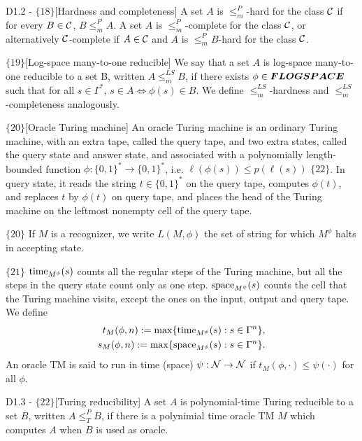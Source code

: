 \documentclass{article}
\begin{document}
\begin{flexidefinition}{D1.2 - $\{18\}$}[Hardness and completeness]
    A set $A$ is $\leq_m^P$-hard for the class $\mathcal{C}$ if for every $B \in \mathcal{C}$, $B \leq_m^P A$. A set $A$ is $\leq_m^P$-complete for the class $\mathcal{C}$, or alternatively $\mathcal{C}$-complete if $A \in \mathcal{C}$ and $A$ is $\leq_m^P B$-hard for the class $\mathcal{C}$. 
\end{flexidefinition} 

\begin{flexidefinition}{$\{19\}$}[Log-space many-to-one reducible]
    We say that a set $A$ is log-space many-to-one reducible to a set B, written $A \leq^{LS}_m B$, if there exists $\phi \in \boldsymbol{FLOGSPACE}$ such that for all $s \in \Gamma^\ast$, $s \in A \iff \phi(s) \in B$. We define $\leq_m^{LS}$-hardness and $\leq_m^{LS}$-completeness analogously.
\end{flexidefinition}


\begin{flexidefinition}{$\{20\}$}[Oracle Turing machine]
    An oracle Turing machine is an ordinary Turing machine, with an extra tape, called the query tape, and two extra states, called the query state and answer state, and associated with a polynomially length-bounded function $\phi : \{0,1\}^\ast \to \{0,1\}^\ast$, i.e. $\ell(\phi(s)) \leq p(\ell(s))$ $\{22\}$. In query state, it reads the string $t \in \{0,1\}^\ast$ on the query tape, computes $\phi(t)$, and replaces $t$ by $\phi(t)$ on query tape, and places the head of the Turing machine on the leftmost nonempty cell of the query tape.
\end{flexidefinition}

$\{20\}$ If $M$ is a recognizer, we write $L(M,\phi)$ the set of string for which $M^\phi$ halts in accepting state.

$\{21\}$ $\operatorname{time}_{M^\phi}(s)$ counts all the regular steps of the Turing machine, but all the steps in the query state count only as one step. $\operatorname{space}_{M^\phi}(s)$ counts the cell that the Turing machine visits, except the ones on the input, output and query tape. We define
\begin{align}
    t_M(\phi, n) := \max \{\operatorname{time}_{M^\phi}(s) : s \in \Gamma^n \},\\
    s_M(\phi, n) := \max \{\operatorname{space}_{M^\phi}(s) : s \in \Gamma^n \}.
\end{align}
An oracle TM is said to run in time (space) $\psi: \mathcal{N} \to \mathcal{N}$ if $t_M(\phi,\cdot) \leq \psi(\cdot)$ for all $\phi$.

\begin{flexidefinition}{D1.3 - $\{22\}$}[Turing reducibility]
    A set $A$ is polynomial-time Turing reducible to a set $B$, written $A \leq_T^P B$, if there is a polynimial time oracle TM $M$ which computes $A$ when $B$ is used as oracle.
\end{flexidefinition}
\end{document}
